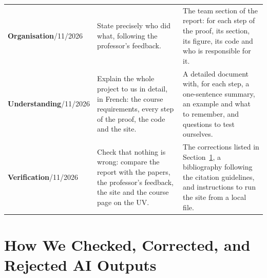 \documentclass[11pt,a4paper]{article}
\begin{document}
{\begin{longtable}{@{}L{2.7cm} L{5.8cm} L{7.2cm}@{}}
\textbf{Organisation}/11/2026 &
State precisely who did what, following the professor's feedback. &
The team section of the report: for each step of the proof, its section, its figure, its code and who is responsible for it. \\

\textbf{Understanding}/11/2026 &
Explain the whole project to us in detail, in French: the course requirements, every step of the proof, the code and the site. &
A detailed document with, for each step, a one-sentence summary, an example and what to remember, and questions to test ourselves. \\

\textbf{Verification}/11/2026 &
Check that nothing is wrong: compare the report with the papers, the professor's feedback, the site and the course page on the UV. &
The corrections listed in Section~\ref{sec:checks}, a bibliography following the citation guidelines, and instructions to run the site from a local file. \\

\bottomrule
\end{longtable}
}

\section{How We Checked, Corrected, and Rejected AI Outputs}
\label{sec:checks}
\end{document}
